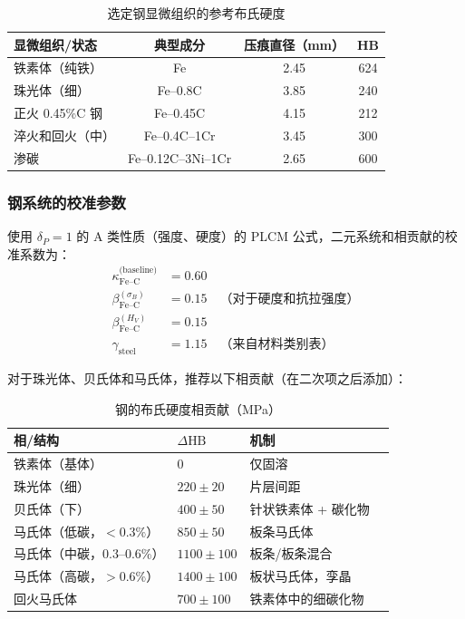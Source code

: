 \documentclass[12pt,a4paper]{article}
\begin{document}
	\begin{table}[htbp]
		\centering
		\caption{选定钢显微组织的参考布氏硬度}
		\label{tab:steel_reference}
		\begin{tabular}{lccc}
			\toprule
			\textbf{显微组织/状态} & \textbf{典型成分} & \textbf{压痕直径（mm）} & \textbf{HB} \\
			\midrule
			铁素体（纯铁） & Fe & 2.45 & 624 \\
			珠光体（细） & Fe–0.8C & 3.85 & 240 \\
			正火 0.45\%C 钢 & Fe–0.45C & 4.15 & 212 \\
			淬火和回火（中） & Fe–0.4C–1Cr & 3.45 & 300 \\
			渗碳 & Fe–0.12C–3Ni–1Cr & 2.65 & 600 \\
			\bottomrule
		\end{tabular}
	\end{table}
	
	\subsubsection{钢系统的校准参数}
	使用 $\delta_P = 1$ 的 A 类性质（强度、硬度）的 PLCM 公式，二元系统和相贡献的校准系数为：
	\begin{align*}
		\kappa_{\text{Fe–C}}^{\text{(baseline)}} &= 0.60 \\
		\beta_{\text{Fe–C}}^{(\sigma_B)} &= 0.15 \quad \text{（对于硬度和抗拉强度）} \\
		\beta_{\text{Fe–C}}^{(H_V)} &= 0.15 \\
		\gamma_{\text{steel}} &= 1.15 \quad \text{（来自材料类别表）}
	\end{align*}
	
	对于珠光体、贝氏体和马氏体，推荐以下相贡献（在二次项之后添加）：
	
	\begin{longtable}{p{3.5cm} p{3.0cm} p{3.0cm} p{4cm}}
		\caption{钢的布氏硬度相贡献（MPa）}\label{tab:steel_phase_contrib}\\
		\toprule
		\textbf{相/结构} & $\Delta\text{HB}$ & \textbf{机制} \\
		\midrule
		铁素体（基体） & 0 & 仅固溶 \\
		珠光体（细） & $220 \pm 20$ & 片层间距 \\
		贝氏体（下） & $400 \pm 50$ & 针状铁素体 + 碳化物 \\
		马氏体（低碳，$<0.3\%$） & $850 \pm 50$ & 板条马氏体 \\
		马氏体（中碳，0.3–0.6\%） & $1100 \pm 100$ & 板条/板条混合 \\
		马氏体（高碳，$>0.6\%$） & $1400 \pm 100$ & 板状马氏体，孪晶 \\
		回火马氏体 & $700 \pm 100$ & 铁素体中的细碳化物 \\
		\bottomrule
	\end{longtable}
	
\end{document}
